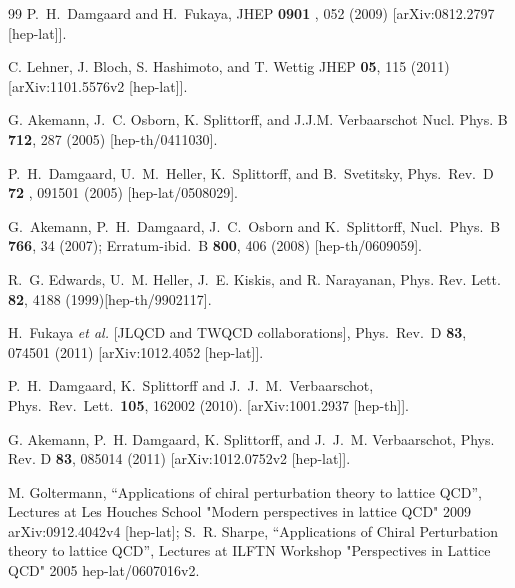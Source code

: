 \documentclass[11pt]{article}
\begin{document}
\begin{thebibliography}{99}
  P.~H.~Damgaard and  H.~Fukaya,
  JHEP {\bf 0901 }, 052 (2009)  
  [arXiv:0812.2797 [hep-lat]].

C. Lehner, J. Bloch, S. Hashimoto, and T. Wettig
JHEP {\bf 05}, 115 (2011)
[arXiv:1101.5576v2 [hep-lat]].

G. Akemann, J.~C. Osborn, K. Splittorff, and J.J.M. Verbaarschot
Nucl. Phys. B {\bf 712}, 287 (2005) 
[hep-th/0411030].

  P.~H.~Damgaard, U.~M.~Heller, K.~Splittorff, and B.~Svetitsky,
  Phys.\ Rev.\  D {\bf 72 }, 091501 (2005)  
  [hep-lat/0508029].

G.~Akemann, P.~H.~Damgaard, J.~C.~Osborn and K.~Splittorff,
  Nucl.\ Phys.\  B {\bf 766}, 34 (2007); 
  Erratum-ibid.\  B {\bf 800},  406 (2008)
  [hep-th/0609059].

R.~G. Edwards, U.~M. Heller, J.~E. Kiskis, and R. Narayanan,
Phys. Rev. Lett. {\bf 82},  4188  (1999)[hep-th/9902117].

  H.~Fukaya {\it et al.}  [JLQCD and TWQCD collaborations],
  Phys.\ Rev.\  D {\bf 83}, 074501 (2011) 
  [arXiv:1012.4052 [hep-lat]].

  P.~H.~Damgaard, K.~Splittorff and J.~J.~M.~Verbaarschot,
  Phys.\ Rev.\ Lett.\  {\bf 105}, 162002 (2010).
  [arXiv:1001.2937 [hep-th]].

 G. Akemann,
P.~H. Damgaard, K. Splittorff, and J.~J.~M. Verbaarschot, Phys. Rev. D {\bf
  83}, 085014 (2011)  
[arXiv:1012.0752v2 [hep-lat]].

M. Goltermann, ``Applications of chiral perturbation theory to lattice QCD'',
Lectures at Les Houches School "Modern perspectives in lattice QCD" 2009
arXiv:0912.4042v4 [hep-lat];\newline
S.~R. Sharpe, ``Applications of Chiral Perturbation theory to lattice QCD'',
Lectures at ILFTN Workshop "Perspectives in Lattice QCD" 2005
hep-lat/0607016v2.


\end{thebibliography}
\end{document}
